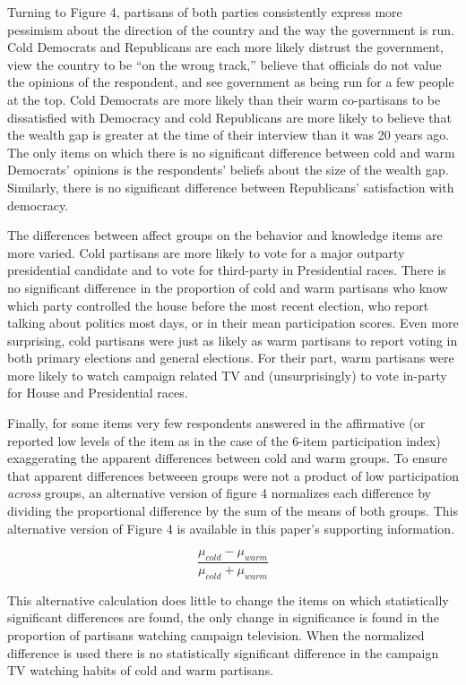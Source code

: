 \documentclass[
]{article}
\begin{document}
Turning to Figure 4, partisans of both parties consistently express more pessimism about the direction of the country and the way the government is run. Cold Democrats and Republicans are each more likely distrust the government, view the country to be ``on the wrong track,'' believe that officials do not value the opinions of the respondent, and see government as being run for a few people at the top. Cold Democrats are more likely than their warm co-partisans to be dissatisfied with Democracy and cold Republicans are more likely to believe that the wealth gap is greater at the time of their interview than it was 20 years ago. The only items on which there is no significant difference between cold and warm Democrats' opinions is the respondents' beliefs about the size of the wealth gap. Similarly, there is no significant difference between Republicans' satisfaction with democracy.

The differences between affect groups on the behavior and knowledge items are more varied. Cold partisans are more likely to vote for a major outparty presidential candidate and to vote for third-party in Presidential races. There is no significant difference in the proportion of cold and warm partisans who know which party controlled the house before the most recent election, who report talking about politics most days, or in their mean participation scores. Even more surprising, cold partisans were just as likely as warm partisans to report voting in both primary elections and general elections. For their part, warm partisans were more likely to watch campaign related TV and (unsurprisingly) to vote in-party for House and Presidential races.

Finally, for some items very few respondents answered in the affirmative (or reported low levels of the item as in the case of the 6-item participation index) exaggerating the apparent differences between cold and warm groups. To ensure that apparent differences betweeen groups were not a product of low participation \emph{across} groups, an alternative version of figure 4 normalizes each difference by dividing the proportional difference by the sum of the means of both groups. This alternative version of Figure 4 is available in this paper's supporting information.

\[
\frac{\mu_{cold} - \mu_{warm}}{\mu_{cold} + \mu_{warm}}
\]

This alternative calculation does little to change the items on which statistically significant differences are found, the only change in significance is found in the proportion of partisans watching campaign television. When the normalized difference is used there is no statistically significant difference in the campaign TV watching habits of cold and warm partisans.
\end{document}

